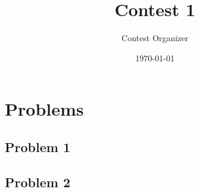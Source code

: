 \documentclass{article}
\title{Contest 1}
\author{Contest Organizer}
\date{\today}
\begin{document}
\maketitle

\section*{Problems}

\subsection*{Problem 1}
% 
\subsection*{Problem 2}
\end{document}
